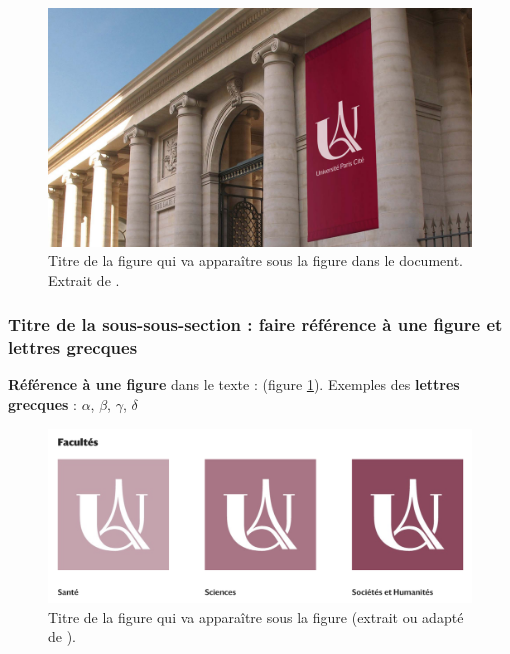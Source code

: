 \begin{figure}[h]
\centering
\includegraphics[scale=0.2]{figures/chap1/SiegeUP_1920-1.jpg} %
\caption[Titre de la figure qui va apparaître dans la table]{Titre de la figure qui va apparaître sous la figure dans le document. Extrait de \cite{Smith2021-wv}.}
\label{fig:siegeUP}
\end{figure}



\subsubsection{Titre de la sous-sous-section : faire référence à une figure et lettres grecques}

\textbf{Référence à une figure} dans le texte : (figure \ref{fig:siegeUP}). 
Exemples des \textbf{lettres grecques} : $\alpha$, $\beta$, $\gamma$, $\delta$


\begin{figure}[ht]
\centering
\includegraphics[scale=0.35]{figures/chap1/faculte-upc.png} %
\caption[Titre de la figure qui va apparaître dans la table]{Titre de la figure qui va apparaître sous la figure (extrait ou adapté de \cite{Faulkes2021}).}
\label{fig:faculteUPC}
\end{figure}


